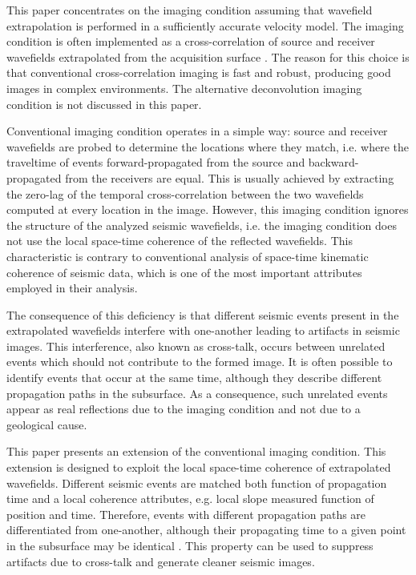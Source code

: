 This paper concentrates on the imaging condition assuming that
wavefield extrapolation is performed in a sufficiently accurate
velocity model. The imaging condition is often implemented as a
cross-correlation of source and receiver wavefields extrapolated from
the acquisition surface \cite[]{Claerbout.iei}. The reason for this
choice is that conventional cross-correlation imaging is fast and
robust, producing good images in complex environments. The alternative
deconvolution imaging condition is not discussed in this paper.

Conventional imaging condition operates in a simple way: source and
receiver wavefields are probed to determine the locations where they
match, i.e. where the traveltime of events forward-propagated from the
source and backward-propagated from the receivers are equal. This is
usually achieved by extracting the zero-lag of the temporal
cross-correlation between the two wavefields computed at every
location in the image. However, this imaging condition ignores the
structure of the analyzed seismic wavefields, i.e. the imaging
condition does not use the local space-time coherence of the reflected
wavefields. This characteristic is contrary to conventional analysis
of space-time kinematic coherence of seismic data, which is one of the
most important attributes employed in their analysis.

The consequence of this deficiency is that different seismic events
present in the extrapolated wavefields interfere with one-another
leading to artifacts in seismic images. This interference, also known
as cross-talk, occurs between unrelated events which should
not contribute to the formed image. It is often possible to identify
events that occur at the same time, although they describe different
propagation paths in the subsurface. As a consequence, such unrelated
events appear as real reflections due to the imaging condition and not
due to a geological cause.

This paper presents an extension of the conventional imaging
condition.  This extension is designed to exploit the local space-time
coherence of extrapolated wavefields. Different seismic events are
matched both function of propagation time and a local coherence
attributes, e.g. local slope measured function of position and time.
Therefore, events with different propagation paths are differentiated
from one-another, although their propagating time to a given point in
the subsurface may be identical
\cite[]{GEO69-02-05620575}. This property can be used to suppress
artifacts due to cross-talk and generate cleaner seismic images.

